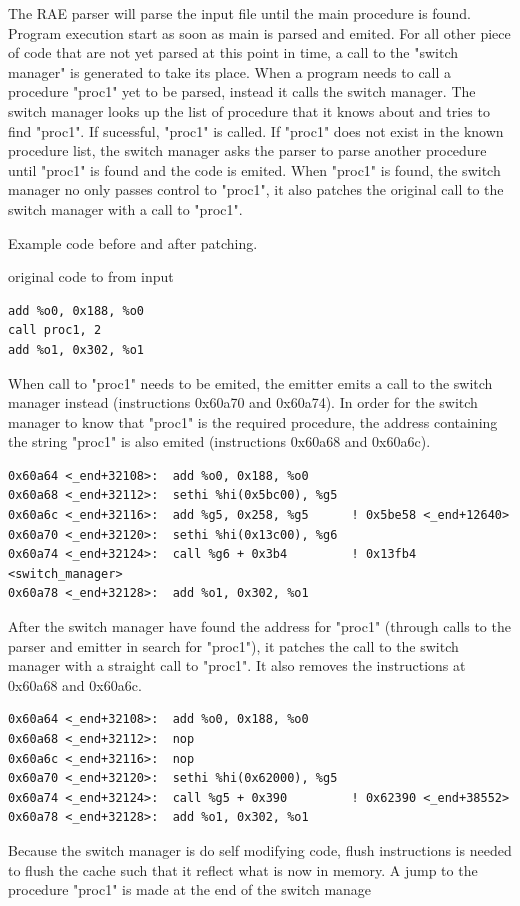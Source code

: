 The RAE parser will parse the input file until the main procedure is
found.  Program execution start as soon as main is parsed and emited.  For
all other piece of code that are not yet parsed at this point in time, a
call to the "switch manager" is generated to take its place.  When a
program needs to call a procedure "proc1" yet to be parsed, instead it
calls the switch manager.  The switch manager looks up the list of
procedure that it knows about and tries to find "proc1".  If sucessful,
"proc1" is called.  If "proc1" does not exist in the known procedure list,
the switch manager asks the parser to parse another procedure until
"proc1"  is found and the code is emited.  When "proc1" is found, the
switch manager no only passes control to "proc1", it also patches the
original call to the switch manager with a call to "proc1". 

Example code before and after patching. 

original code to from input

\begin{verbatim}
add %o0, 0x188, %o0 
call proc1, 2 
add %o1, 0x302, %o1
\end{verbatim}

When call to "proc1" needs to be emited, the emitter emits a call to the
switch manager instead (instructions 0x60a70 and 0x60a74).  In order for
the switch manager to know that "proc1" is the required procedure, the
address containing the string "proc1" is also emited (instructions 0x60a68
and 0x60a6c). 

\begin{verbatim}
0x60a64 <_end+32108>:  add %o0, 0x188, %o0 
0x60a68 <_end+32112>:  sethi %hi(0x5bc00), %g5 
0x60a6c <_end+32116>:  add %g5, 0x258, %g5      ! 0x5be58 <_end+12640> 
0x60a70 <_end+32120>:  sethi %hi(0x13c00), %g6 
0x60a74 <_end+32124>:  call %g6 + 0x3b4         ! 0x13fb4 <switch_manager>
0x60a78 <_end+32128>:  add %o1, 0x302, %o1
\end{verbatim}

After the switch manager have found the address for "proc1" (through calls
to the parser and emitter in search for "proc1"), it patches the call to
the switch manager with a straight call to "proc1".  It also removes the
instructions at 0x60a68 and 0x60a6c. 

\begin{verbatim}
0x60a64 <_end+32108>:  add %o0, 0x188, %o0 
0x60a68 <_end+32112>:  nop
0x60a6c <_end+32116>:  nop 
0x60a70 <_end+32120>:  sethi %hi(0x62000), %g5
0x60a74 <_end+32124>:  call %g5 + 0x390 		! 0x62390 <_end+38552> 
0x60a78 <_end+32128>:  add %o1, 0x302, %o1
\end{verbatim}

Because the switch manager is do self modifying code, flush instructions
is needed to flush the cache such that it reflect what is now in memory. 
A jump to the procedure "proc1" is made at the end of the switch manage
